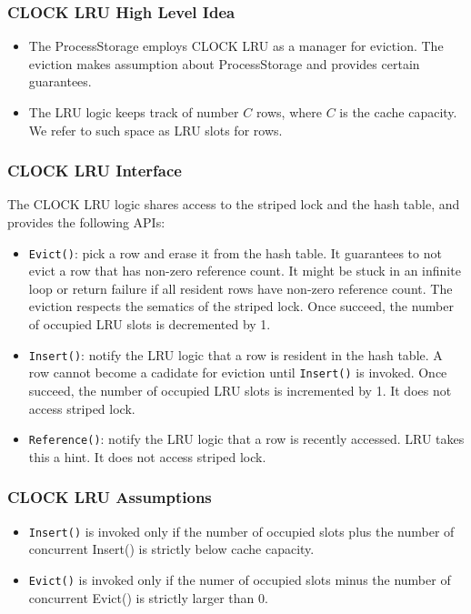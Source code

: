 \documentclass{beamer}
\begin{document}
\begin{frame}
  \frametitle{CLOCK LRU High Level Idea}
\begin{itemize}
\item The ProcessStorage employs CLOCK LRU as a manager for eviction. The eviction makes 
assumption about ProcessStorage and provides certain guarantees.
\item The LRU logic keeps track of number $C$ rows, where $C$ is the cache capacity. We
refer to such space as LRU slots for rows. 
\end{itemize}
\end{frame}

\begin{frame}
\frametitle{CLOCK LRU Interface}
The CLOCK LRU logic shares access to the striped lock and the hash table, and 
provides the following APIs:

\begin{itemize}
\item \texttt{Evict()}: pick a row and erase it from the hash table. 
  It guarantees to not evict a row that has non-zero reference count. It might
  be stuck in an infinite loop or return failure if all resident rows have non-zero
  reference count. The eviction respects the sematics of the striped lock. Once
  succeed, the number of occupied LRU slots is decremented by 1.
\item \texttt{Insert()}: notify the LRU logic that a row is resident in the 
  hash table. A row cannot become a cadidate for eviction until \texttt{Insert()}
  is invoked. Once succeed, the number of occupied LRU slots is incremented by 1.
  It does not access striped lock.
\item \texttt{Reference()}: notify the LRU logic that a row is recently accessed.
LRU takes this a hint. It does not access striped lock.
\end{itemize}
\end{frame}

\begin{frame}
\frametitle{CLOCK LRU Assumptions}
\begin{itemize}
\item \texttt{Insert()} is invoked only if the number of occupied slots plus the 
  number of concurrent Insert() is strictly below cache capacity.
\item \texttt{Evict()} is invoked only if the numer of occupied slots minus the 
  number of concurrent Evict() is strictly larger than 0.
\end{itemize}
\end{frame}
\end{document}
